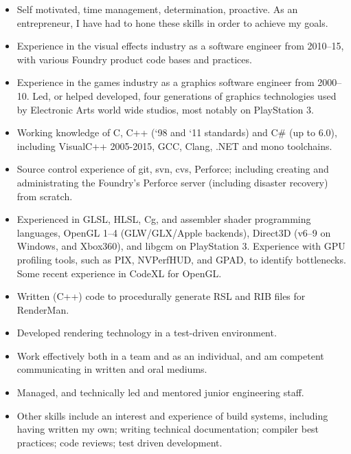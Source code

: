 \documentclass[a4paper,12pt]{article}
\newcommand{\me}{Mark Final BSc (Hons) AMIMA}
\newcommand{\cvheading}[1]{{\medskip\noindent\hspace{-5mm}{\sc #1}\par}}
\begin{document}
\cvheading{Professional Skills}
\begin{itemize}
\item Self motivated, time management, determination, proactive. As an entrepreneur, I have had to hone these skills in order to achieve my goals.
\item Experience in the visual effects industry as a software engineer from 2010--15, with various Foundry product code bases and practices.
\item Experience in the games industry as a graphics software engineer from 2000--10. Led, or helped developed, four generations of graphics technologies used by Electronic Arts world wide studios, most notably on PlayStation 3.
\item Working knowledge of C, C++ (`98 and `11 standards) and C\# (up to 6.0), including VisualC++ 2005-2015, GCC, Clang, .NET and mono toolchains.
\item Source control experience of git, svn, cvs, Perforce; including creating and administrating the Foundry's Perforce server (including disaster recovery) from scratch.
\item Experienced in GLSL, HLSL, Cg, and assembler shader programming languages, OpenGL 1--4 (GLW/GLX/Apple backends), Direct3D (v6--9 on Windows, and Xbox360), and libgcm on PlayStation 3. Experience with GPU profiling tools, such as PIX, NVPerfHUD, and GPAD, to identify bottlenecks. Some recent experience in CodeXL for OpenGL.
\item Written (C++) code to procedurally generate RSL and RIB files for RenderMan.
\item Developed rendering technology in a test-driven environment.
\item Work effectively both in a team and as an individual, and am competent communicating in written and oral mediums.
\item Managed, and technically led and mentored junior engineering staff.
\item Other skills include an interest and experience of build systems, including having written my own; writing technical documentation; compiler best practices; code reviews; test driven development.
\end{itemize}

\pagebreak
\renewcommand{\thepage}{\tiny{\me\hfill\arabic{page}\hfill Curriculum Vitae}}
\end{document}
